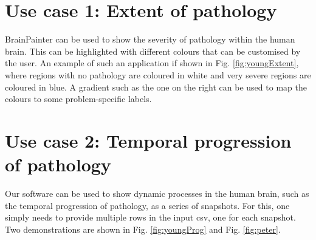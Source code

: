 \documentclass[final,times,twocolumn,authoryear]{elsarticle}
\begin{document}
\section{Use case 1: Extent of pathology}
\label{extent}

BrainPainter can be used to show the severity of pathology within the human brain. This can be highlighted with different colours that can be customised by the user. An example of such an application if shown in Fig. \ref{fig:youngExtent}, where regions with no pathology are coloured in white and very severe regions are coloured in blue. A gradient such as the one on the right can be used to map the colours to some problem-specific labels.




\section{Use case 2: Temporal progression of pathology}
\label{progression}

Our software can be used to show dynamic processes in the human brain, such as the temporal progression of pathology, as a series of snapshots. For this, one simply needs to provide multiple rows in the input csv, one for each snapshot. Two demonstrations are shown in Fig. \ref{fig:youngProg} and Fig. \ref{fig:peter}.
\end{document}
